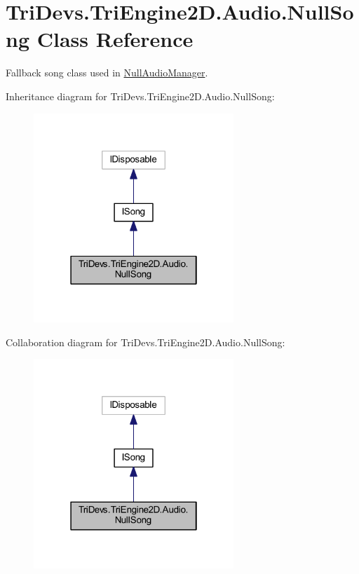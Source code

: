 \hypertarget{class_tri_devs_1_1_tri_engine2_d_1_1_audio_1_1_null_song}{\section{Tri\-Devs.\-Tri\-Engine2\-D.\-Audio.\-Null\-Song Class Reference}
\label{class_tri_devs_1_1_tri_engine2_d_1_1_audio_1_1_null_song}
}


Fallback song class used in \hyperlink{class_tri_devs_1_1_tri_engine2_d_1_1_audio_1_1_null_audio_manager}{Null\-Audio\-Manager}.  




Inheritance diagram for Tri\-Devs.\-Tri\-Engine2\-D.\-Audio.\-Null\-Song\-:
\nopagebreak
\begin{figure}[H]
\begin{center}
\leavevmode
\includegraphics[width=214pt]{class_tri_devs_1_1_tri_engine2_d_1_1_audio_1_1_null_song__inherit__graph}
\end{center}
\end{figure}


Collaboration diagram for Tri\-Devs.\-Tri\-Engine2\-D.\-Audio.\-Null\-Song\-:
\nopagebreak
\begin{figure}[H]
\begin{center}
\leavevmode
\includegraphics[width=214pt]{class_tri_devs_1_1_tri_engine2_d_1_1_audio_1_1_null_song__coll__graph}
\end{center}
\end{figure}

